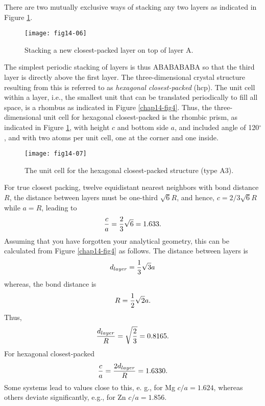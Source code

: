 There are two mutually exclusive ways of stacking any two layers as
indicated in Figure \ref{chap14-fig5}.
\begin{figure}
\texttt{[image: fig14-06]}
\caption{Stacking a new closest-packed layer on top of layer A.}
\label{chap14-fig5}
\end{figure}

The simplest periodic stacking of layers is thus ABABABABA so that the
third layer is directly above the first layer.  The three-dimensional
crystal structure resulting from this is referred to as
\emph{hexagonal closest-packed} (hcp).  The unit cell within a layer,
i.e., the smallest unit that can be translated periodically to fill
all space, is a rhombus as indicated in Figure \ref{chap14-fig4}.
Thus, the three-dimensional unit cell for hexagonal closest-packed is
the rhombic prism, as indicated in Figure \ref{chap14-fig5}, with
height $c$ and bottom side $a$, and included angle of 120$^{\circ}$,
and with two atoms per unit cell, one at the corner and one inside.

\begin{figure}
\texttt{[image: fig14-07]}
\caption{The unit cell for the hexagonal closest-packed structure (type A3).}
\label{chap14-fig6}
\end{figure}

For true closest
packing, twelve equidistant nearest neighbors with bond distance $R$, the 
distance between layers must be one-third $\sqrt{6}R$, and hence, $c = 
2/3 \sqrt{6}R$ while $a = R$, leading to
\begin{equation}
{c \over a} = {2 \over 3} \sqrt{6} = 1.633 .
\end{equation}
Assuming that you have forgotten your analytical geometry, this can be
calculated from Figure \ref{chap14-fig4} as follows.  The distance
between layers is
\begin{equation}
d_{layer} = {1 \over 3} \sqrt{3}a
\end{equation}
whereas, the bond distance is
\begin{equation}
R = {1 \over 2} \sqrt{2} a.
\end{equation}
Thus,
\begin{equation}
{d_{layer} \over R} = \sqrt{{2 \over 3}} = 0.8165 .
\end{equation}
For hexagonal closest-packed
\begin{equation}
{c \over a} = {2d_{layer} \over R} = 1.6330.
\end{equation}
Some systems lead to values close to this, e. g., for Mg $c/a = 
1.624$, whereas others deviate significantly, e.g., for Zn $c/a = 1.856$.

